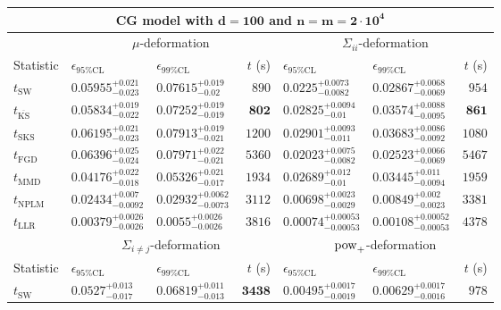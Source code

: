 \begin{tabular}{l|llr|llr}
	\toprule
	\multicolumn{7}{c}{{\bf CG model with $\mathbf{d=100}$ and $\mathbf{n=m=2\cdot 10^{4}}$}} \\
	\toprule
	\multicolumn{1}{c}{} & \multicolumn{3}{c}{$\mu$-deformation} & \multicolumn{3}{c}{$\Sigma_{ii}$-deformation} \\
	Statistic & $\epsilon_{95\%\mathrm{CL}}$ & $\epsilon_{99\%\mathrm{CL}}$ & $t$ (s) & $\epsilon_{95\%\mathrm{CL}}$ & $\epsilon_{99\%\mathrm{CL}}$ & $t$ (s) \\
	\midrule
	$t_{\mathrm{SW}}$ & $0.05955_{-0.023}^{+0.021}$ & $0.07615_{-0.02}^{+0.019}$ & $890$ & $0.0225_{-0.0082}^{+0.0073}$ & $0.02867_{-0.0069}^{+0.0068}$ & $954$ \\
	$t_{\overline{\mathrm{KS}}}$ & $0.05834_{-0.022}^{+0.019}$ & $0.07252_{-0.019}^{+0.019}$ & ${\mathbf{802}}$ & $0.02825_{-0.01}^{+0.0094}$ & $0.03574_{-0.0095}^{+0.0088}$ & ${\mathbf{861}}$ \\
	$t_{\mathrm{SKS}}$ & $0.06195_{-0.023}^{+0.021}$ & $0.07913_{-0.021}^{+0.019}$ & $1200$ & $0.02901_{-0.011}^{+0.0093}$ & $0.03683_{-0.0092}^{+0.0086}$ & $1080$ \\
	$t_{\mathrm{FGD}}$ & $0.06396_{-0.024}^{+0.025}$ & $0.07971_{-0.021}^{+0.022}$ & $5360$ & ${\mathbf{0.02023_{-0.0082}^{+0.0075}}}$ & ${\mathbf{0.02523_{-0.0069}^{+0.0066}}}$ & $5467$ \\
	$t_{\mathrm{MMD}}$ & ${\mathbf{0.04176_{-0.018}^{+0.022}}}$ & ${\mathbf{0.05326_{-0.017}^{+0.021}}}$ & $1934$ & $0.02689_{-0.01}^{+0.012}$ & $0.03445_{-0.0094}^{+0.011}$ & $1959$ \\
\rowcolor{red!35}	$t_{\mathrm{NPLM}}$ & $0.02434_{-0.0092}^{+0.007}$ & $0.02932_{-0.0073}^{+0.0062}$ & $3112$ & $0.00698_{-0.0029}^{+0.0023}$ & $0.00849_{-0.0023}^{+0.002}$ & $3381$ \\
	$t_{\mathrm{LLR}}$ & $0.00379_{-0.0026}^{+0.0026}$ & $0.0055_{-0.0026}^{+0.0026}$ & $3816$ & $0.00074_{-0.00053}^{+0.00053}$ & $0.00108_{-0.00053}^{+0.00052}$ & $4378$ \\
	\toprule
	\multicolumn{1}{c}{} & \multicolumn{3}{c}{$\Sigma_{i\neq j}$-deformation} & \multicolumn{3}{c}{$\rm{pow}_{+}$-deformation} \\
	Statistic & $\epsilon_{95\%\mathrm{CL}}$ & $\epsilon_{99\%\mathrm{CL}}$ & $t$ (s) & $\epsilon_{95\%\mathrm{CL}}$ & $\epsilon_{99\%\mathrm{CL}}$ & $t$ (s) \\
	\midrule
	$t_{\mathrm{SW}}$ & $0.0527_{-0.017}^{+0.013}$ & $0.06819_{-0.013}^{+0.011}$ & ${\mathbf{3438}}$ & $0.00495_{-0.0019}^{+0.0017}$ & $0.00629_{-0.0016}^{+0.0017}$ & $978$ \\

\end{tabular}
